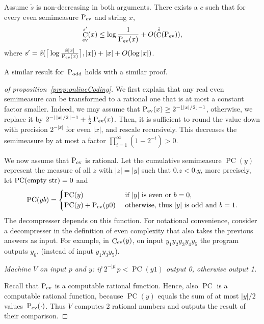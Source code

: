 \documentclass[runningheads]{llncs}
\DeclareMathOperator{\C}{C} \newcommand{\Cev}{\C_\textnormal{ev}} \newcommand{\Codd}{\C_\textnormal{odd}}
\DeclareMathOperator{\Pev}{P_{\textnormal{ev}}} \DeclareMathOperator{\Podd}{P_{\textnormal{odd}}} \DeclareMathOperator{\Pc}{PC}
\begin{document}
\begin{proposition}\label{prop:onlineCodingSpaceBounded}
  Assume $\tilde s$ is non-decreasing in both arguments. 
 There exists a $c$ such that for every even semimeasure $\Pev$ and string $x$, 
  \[
    \Cev^{s'}(x) \le \log \frac 1 {\Pev(x)} + O(\C^{\tilde s}(\Pev)),  
  \]
  where $s' = \tilde{s}(\big\lceil\log \frac {8|x|}{\Pev(x)}\big\rceil,|x|) + |x| + O(\log |x|)$. 
\end{proposition}

\noindent
A similar result for~$\Podd$ holds with a similar proof. 

\begin{proof}[of proposition~\ref{prop:onlineCoding}] 
  We first explain that any real even semimeasure can be transformed to a rational one that is at most a constant factor smaller. 
  Indeed, we may assume that $\Pev(x) \ge 2^{-\lfloor |x|/2\rfloor - 1}$, otherwise, we replace it by $2^{-\lfloor |x|/2\rfloor - 1} + \tfrac 1 2 \Pev(x)$. 
  Then, it is sufficient to round the value down with precision $2^{-|x|}$ for even $|x|$, and rescale recursively. 
  This decreases the semimeasure by at most a factor
  $
    \prod_{i=1}^\infty (1 - 2^{-i}) > 0. 
    $

  We now assume that $\Pev$ is rational. 
  Let the cumulative semimeasure $\Pc(y)$ represent the measure of all $z$ with $|z|=|y|$ such that $0.z < 0.y$, 
  more precisely, let $\Pc(\textnormal{empty str}) = 0$ and
  \[
    \Pc(yb) = 
	\begin{cases}
	  \Pc(y) & \text{ if } |y| \textnormal{ is even or } b=0, \\
	  \Pc(y) + \Pev(y0) & \textnormal{ otherwise, thus $|y|$ is odd and $b=1$.}
	\end{cases}
  \]
  The decompresser depends on this function. 
  For notational convenience, consider a decompresser in the definition of even complexity that also takes the previous answers as input. 
  For example, in $\Cev(y)$, on input $y_1y_2y_3y_4y_5$ the program outputs $y_6$, (instead of input $y_1y_3y_5$). 

  \medskip
  \noindent
  {\em Machine $V$ on input $p$ and $y$:
  if $2^{-|p|}p < \Pc(y1)$ output 0, otherwise output 1.} 

  \medskip
  \noindent
  Recall that $\Pev$ is a computable rational function. 
  Hence, also $\Pc$ is a computable rational function, 
  because $\Pc(y)$ equals the sum of at most $|y|/2$ values~$\Pev(\cdot)$. 
  Thus $V$ computes 2 rational numbers and outputs the result of their comparison. 


\end{proof}
\end{document}
